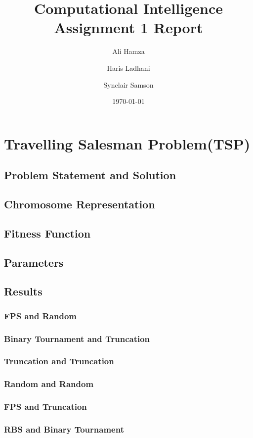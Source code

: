 \documentclass{article}
\title{Computational Intelligence \\Assignment 1 Report}
\date{\today}
\author{Ali Hamza \and Haris Ladhani \and Synclair Samson}
\begin{document}
\maketitle
\newpage
\tableofcontents

\section{Travelling Salesman Problem(TSP)}
\subsection{Problem Statement and Solution}
\subsection{Chromosome Representation}

\subsection{Fitness Function}
\subsection{Parameters}
\subsection{Results} 
\subsubsection {FPS and Random}
\subsubsection {Binary Tournament and Truncation}
\subsubsection {Truncation and Truncation}
\subsubsection {Random and Random}
\subsubsection {FPS and Truncation}
\subsubsection {RBS and Binary Tournament}
\end{document}
